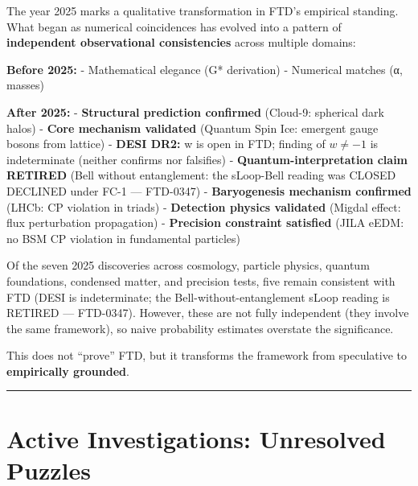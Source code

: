 \documentclass[
  11pt,
  letterpaper,
  twoside,
  openany]{book}
\makeatletter
\let\orig@section\section
\renewcommand{\section}{\needspace{8\baselineskip}\orig@section}
\makeatother
\begin{document}
\begin{tcolorbox}[enhanced jigsaw, colbacktitle=quarto-callout-note-color!10!white, titlerule=0mm, bottomtitle=1mm, bottomrule=.15mm, colback=white, arc=.35mm, breakable, toprule=.15mm, title=\textcolor{quarto-callout-note-color}{\faInfo}\hspace{0.5em}{The Epistemic Situation (Updated 2025)}, rightrule=.15mm, coltitle=black, leftrule=.75mm, colframe=quarto-callout-note-color-frame, toptitle=1mm, opacityback=0, opacitybacktitle=0.6, left=2mm]

The year 2025 marks a qualitative transformation in FTD's empirical
standing. What began as numerical coincidences has evolved into a
pattern of \textbf{independent observational consistencies} across
multiple domains:

\textbf{Before 2025:} - Mathematical elegance (G* derivation) -
Numerical matches (α, masses)

\textbf{After 2025:} - \textbf{Structural prediction confirmed}
(Cloud-9: spherical dark halos) - \textbf{Core mechanism validated}
(Quantum Spin Ice: emergent gauge bosons from lattice) - \textbf{DESI
DR2:} w is open in FTD; finding of \(w \neq -1\) is indeterminate
(neither confirms nor falsifies) - \textbf{Quantum-interpretation claim
RETIRED} (Bell without entanglement: the sLoop-Bell reading was CLOSED
DECLINED under FC-1 --- FTD-0347) - \textbf{Baryogenesis mechanism
confirmed} (LHCb: CP violation in triads) - \textbf{Detection physics
validated} (Migdal effect: flux perturbation propagation) -
\textbf{Precision constraint satisfied} (JILA eEDM: no BSM CP violation
in fundamental particles)

Of the seven 2025 discoveries across cosmology, particle physics,
quantum foundations, condensed matter, and precision tests, five remain
consistent with FTD (DESI is indeterminate; the
Bell-without-entanglement sLoop reading is RETIRED --- FTD-0347).
However, these are not fully independent (they involve the same
framework), so naive probability estimates overstate the significance.

This does not ``prove'' FTD, but it transforms the framework from
speculative to \textbf{empirically grounded}.

\end{tcolorbox}

\begin{center}\rule{0.5\linewidth}{0.5pt}\end{center}

\section{Active Investigations: Unresolved
Puzzles}\label{sec-active-investigations}
\end{document}
